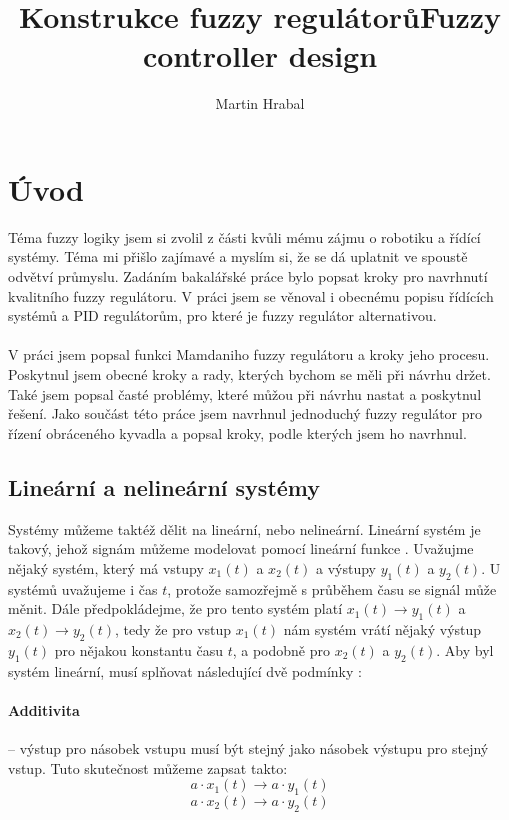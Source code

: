 \documentclass[
  program=inf,
  figures,
  tables,
  glossaries,
  index
]{kidiplom}
\title{Konstrukce fuzzy regulátorů}
\title[english]{Fuzzy controller design}
\subtitle{}
\subtitle[english]{}
\author{Martin Hrabal}
\begin{document}
\maketitle



\newcommand{\BibLaTeX}{\textsc{Bib}\LaTeX}


\section{Úvod}
Téma fuzzy logiky jsem si zvolil z části kvůli mému zájmu o robotiku a řídící systémy. Téma mi přišlo zajímavé a myslím si, že se dá uplatnit ve spoustě odvětví průmyslu. Zadáním bakalářské práce bylo popsat kroky pro navrhnutí kvalitního fuzzy regulátoru. V práci jsem se věnoval i obecnému popisu řídících systémů a PID regulátorům, pro které je fuzzy regulátor alternativou. \\ \\
V práci jsem popsal funkci Mamdaniho fuzzy regulátoru a kroky jeho procesu. Poskytnul jsem obecné kroky a rady, kterých bychom se měli při návrhu držet. Také jsem popsal časté problémy, které můžou při návrhu nastat a poskytnul řešení.
Jako součást této práce jsem navrhnul jednoduchý fuzzy regulátor pro řízení obráceného kyvadla a popsal kroky, podle kterých jsem ho navrhnul.

\subsection{Lineární a nelineární systémy}
Systémy můžeme taktéž dělit na lineární, nebo nelineární. Lineární systém je takový, jehož signám můžeme modelovat pomocí lineární funkce \cite{bLCSA}. Uvažujme nějaký systém, který má vstupy $x_{1}(t)$ a $x_{2}(t)$ a výstupy $y_{1}(t)$ a $y_{2}(t)$. U systémů uvažujeme i čas $t$, protože samozřejmě s průběhem času se signál může měnit. Dále předpokládejme, že pro tento systém platí $x_{1}(t) \rightarrow y_{1}(t)$ a $x_{2}(t) \rightarrow y_{2}(t)$, tedy že pro vstup $x_{1}(t)$ nám systém vrátí nějaký výstup $y_{1}(t)$ pro nějakou konstantu času $t$, a podobně pro $x_{2}(t)$ a $y_{2}(t)$. Aby byl systém lineární, musí splňovat následující dvě podmínky \cite{bMCS}\cite{bLCSA}: \paragraph{Additivita} -- výstup pro násobek vstupu musí být stejný jako násobek výstupu pro stejný vstup. Tuto skutečnost můžeme zapsat takto: 
\[ a \cdot x_{1}(t) \rightarrow a \cdot y_{1}(t)\]
\[ a \cdot x_{2}(t) \rightarrow a \cdot y_{2}(t)\]
\end{document}
